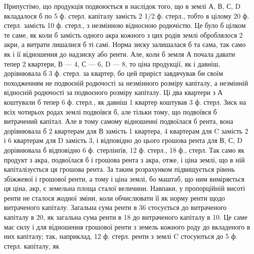 Припустімо, що продукція подвоюється в наслідок того, що в землі А,
В, С, D вкладалося б по 5 ф. стерл. капіталу замість 2 1/2 ф. стерл., тобто
в цілому 20 ф. стерл. замість 10 ф. стерл., з незмінною відносною родючістю.
Це було б цілком те саме, як коли б замість одного акра кожного з цих
родів землі оброблялося 2 акри, а витрати лишалися б ті самі. Норма зиску
залишалася б та сама, так само як і її відношення до надзиску або ренти. Але,
коли б земля А почала давати тепер 2 квартери, В — 4, С — 6, D — 8, то ціна
продукції, як і давніш, дорівнювала б 3 ф. стерл. за квартер, бо цей приріст
завдячував би своїм походженням не подвоєній родючості за незмінного розміру
капіталу, а незмінній відносній родючості за подвоєного розміру капіталу. Ці
два квартери з А коштували б тепер 6 ф. стерл., як давніш 1 квартер коштував
3 ф. стерл. Зиск на всіх чотирьох родах землі подвоївся б, але тільки
тому, що подвоївся б витрачений капітал. Але в тому самому відношенні подвоїлася
б рента, вона дорівнювала б 2 квартерам для В замість 1 квартера, 4 квартерам
для C замість 2 і 6 квартерам для D замість 3, і відповідно до цього
грошова рента для В, С, D дорівнювала б відповідно 6 ф. стерлінґів, 12 ф.
стерл., 18 ф., стерл. Так само як продукт з акра, подвоїлася б і грошова
рента з акра, отже, і ціна землі, що в ній капіталізується ця грошова рента. За
таким розрахунком підвищується рівень збіжжевої і грошової ренти, а тому і
ціна землі, бо маштаб, що ним виміряється ця ціна, акр, є земельна площа
сталої величини. Навпаки, у пропорційній висоті ренти не сталося жодної зміни,
коли обчислювати її як норму ренти щодо витраченого капіталу. Загальна сума
ренти в 36 стосується до витраченого капіталу в 20, як загальна сума ренти
в 18 до витраченого капіталу в 10. Це саме має силу і для відношення грошової
ренти з земель кожного роду до вкладеного в них капіталу; так, наприклад,
12 ф. стерл. ренти з землі C стосуються до 5 ф. стерл. капіталу, як
